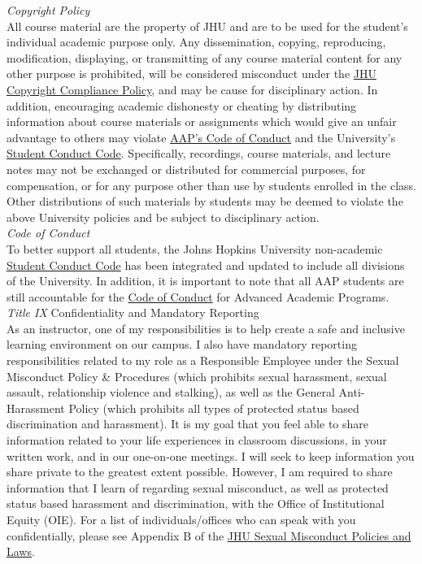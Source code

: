 \documentclass[11pt]{article}
\begin{document}
\emph{Copyright Policy} \\
All course material are the property of JHU and are to be used for the student's individual academic purpose only. Any dissemination, copying, reproducing, modification, displaying, or transmitting of any course material content for any other purpose is prohibited, will be considered misconduct under the \href{https://www.jhu.edu/assets/uploads/2016/11/compliance_policy.pdf}{JHU Copyright Compliance Policy}, and may be cause for disciplinary action. In addition, encouraging academic dishonesty or cheating by distributing information about course materials or assignments which would give an unfair advantage to others may violate \href{http://advanced.jhu.edu/current-students/policies/code-of-conduct/}{AAP’s Code of Conduct} and the University’s \href{https://studentaffairs.jhu.edu/policies-guidelines/student-code}{Student Conduct Code}. Specifically, recordings, course materials, and lecture notes may not be exchanged or distributed for commercial purposes, for compensation, or for any purpose other than use by students enrolled in the class. Other distributions of such materials by students may be deemed to violate the above University policies and be subject to disciplinary action. \\
\emph{Code of Conduct} \\
To better support all students, the Johns Hopkins University non-academic \href{http://advanced.jhu.edu/current-students/policies/code-of-conduct/}{Student Conduct Code} has been integrated and updated to include all divisions of the University. In addition, it is important to note that all AAP students are still accountable for the \href{http://advanced.jhu.edu/current-students/policies/code-of-conduct/}{Code of Conduct} for Advanced Academic Programs. \\
\emph{Title IX}
Confidentiality and Mandatory Reporting \\
As an instructor, one of my responsibilities is to help create a safe and inclusive learning environment on our campus. I also have mandatory reporting responsibilities related to my role as a Responsible Employee under the Sexual Misconduct Policy \& Procedures (which prohibits sexual harassment, sexual assault, relationship violence and stalking), as well as the General Anti-Harassment Policy (which prohibits all types of protected status based discrimination and harassment). It is my goal that you feel able to share information related to your life experiences in classroom discussions, in your written work, and in our one-on-one meetings. I will seek to keep information you share private to the greatest extent possible. However, I am required to share information that I learn of regarding sexual misconduct, as well as protected status based harassment and discrimination, with the Office of Institutional Equity (OIE). For a list of individuals/offices who can speak with you confidentially, please see Appendix B of the \href{http://sexualassault.jhu.edu/policies-laws}{JHU Sexual Misconduct Policies and Laws}.\\
\end{document}
